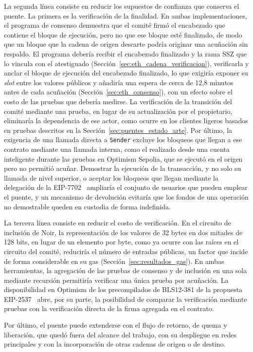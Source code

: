 La segunda línea consiste en reducir los supuestos de confianza que conserva el puente. La
primera es la verificación de la finalidad. En ambas implementaciones, el programa de consenso
demuestra que el comité firmó el encabezado que contiene el bloque de ejecución, pero no que ese
bloque esté finalizado, de modo que un bloque que la cadena de origen descarte podría originar una
acuñación sin respaldo. El programa debería recibir el encabezado finalizado y la rama SSZ que lo
vincula con el atestiguado (Sección~\ref{sec:eth_cadena_verificacion}), verificarla y anclar el
bloque de ejecución del encabezado finalizado, lo que exigiría exponer su \textit{slot} entre los
valores públicos y añadiría una espera de cerca de 12,8 minutos antes de cada acuñación
(Sección~\ref{sec:eth_consenso}), con un efecto sobre el costo de las pruebas que debería medirse.
La verificación de la transición del comité mediante una prueba, en lugar
de su actualización por el propietario, eliminaría la dependencia de ese actor, como ocurre en los
clientes ligeros basados en pruebas descritos en la Sección~\ref{sec:puentes_estado_arte}. Por
último, la exigencia de una llamada directa a \texttt{Sender} excluye los bloqueos que llegan a ese
contrato mediante una llamada interna, como el realizado desde una cuenta inteligente durante las
pruebas en Optimism Sepolia, que se ejecutó en el origen pero no permitió acuñar. Demostrar la ejecución de la
transacción, y no solo su llamada de nivel superior, o aceptar los bloqueos que llegan mediante la
delegación de la EIP-7702~\cite{eip7702} ampliaría el conjunto de usuarios que pueden emplear el
puente, y un mecanismo de devolución evitaría que los fondos de una operación no demostrable
queden en custodia de forma indefinida.

La tercera línea consiste en reducir el costo de verificación. En el circuito de inclusión de Noir,
la representación de los valores de 32 bytes en dos mitades de 128 bits, en lugar de un elemento
por byte, como ya ocurre con las raíces en el circuito del comité, reduciría el número de
entradas públicas, un factor que incide de forma considerable en su gas
(Sección~\ref{sec:resultados_gas}). En ambas herramientas, la agregación de las pruebas de consenso
y de inclusión en una sola mediante recursión permitiría verificar una única prueba por
acuñación. La disponibilidad en Optimism de los precompilados de BLS12-381 de la propuesta
EIP-2537~\cite{eip2537} abre, por su parte, la posibilidad de comparar la verificación mediante
pruebas con la verificación directa de la firma agregada en el contrato.

Por último, el puente puede extenderse con el flujo de retorno, de quema y liberación, que quedó
fuera del alcance del trabajo, con su despliegue en redes principales y con la incorporación de
otras cadenas de origen o de destino.
